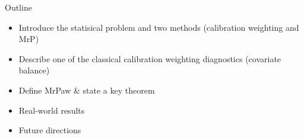 

\begin{frame}{Outline}
%
\begin{itemize}
    \item Introduce the statisical problem and two methods (calibration weighting and MrP)
    \item Describe one of the classical calibration weighting diagnostics (covariate balance)
    \item Define MrPaw \& state a key theorem
    \item Real-world results
    \item Future directions
\end{itemize}
%
\end{frame}
